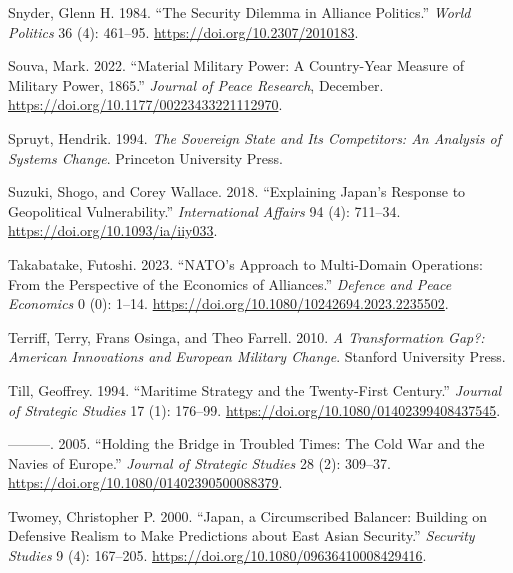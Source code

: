 \documentclass[
  12,
  letterpaper,
  DIV=11,
  numbers=noendperiod]{scrartcl}
\newlength{\cslhangindent}
\newlength{\cslentryspacingunit} %
\newenvironment{CSLReferences}[2] %
 {%
  \setlength{\parindent}{0pt}
  \ifodd #1
  \let\oldpar\par
  \def\par{\hangindent=\cslhangindent\oldpar}
  \fi
  \setlength{\parskip}{#2\cslentryspacingunit}
 }%
 {}
\begin{document}
\begin{CSLReferences}{1}{0}
\leavevmode{}%
Snyder, Glenn H. 1984. {``The {Security Dilemma} in {Alliance
Politics}.''} \emph{World Politics} 36 (4): 461--95.
\url{https://doi.org/10.2307/2010183}.

\leavevmode{}%
Souva, Mark. 2022. {``Material Military Power: {A} Country-Year Measure
of Military Power, 1865.''} \emph{Journal of Peace
Research}, December. \url{https://doi.org/10.1177/00223433221112970}.

\leavevmode{}%
Spruyt, Hendrik. 1994. \emph{The {Sovereign State} and {Its
Competitors}: {An Analysis} of {Systems Change}}. {Princeton University
Press}.

\leavevmode{}%
Suzuki, Shogo, and Corey Wallace. 2018. {``Explaining {Japan}'s Response
to Geopolitical Vulnerability.''} \emph{International Affairs} 94 (4):
711--34. \url{https://doi.org/10.1093/ia/iiy033}.

\leavevmode{}%
Takabatake, Futoshi. 2023. {``{NATO}'s {Approach} to {Multi-Domain
Operations}: {From} the {Perspective} of the {Economics} of
{Alliances}.''} \emph{Defence and Peace Economics} 0 (0): 1--14.
\url{https://doi.org/10.1080/10242694.2023.2235502}.

\leavevmode{}%
Terriff, Terry, Frans Osinga, and Theo Farrell. 2010. \emph{A
{Transformation Gap}?: {American Innovations} and {European Military
Change}}. {Stanford University Press}.

\leavevmode{}%
Till, Geoffrey. 1994. {``Maritime Strategy and the Twenty-First
Century.''} \emph{Journal of Strategic Studies} 17 (1): 176--99.
\url{https://doi.org/10.1080/01402399408437545}.

\leavevmode{}%
---------. 2005. {``Holding the {Bridge} in {Troubled Times}: {The Cold
War} and the {Navies} of {Europe}.''} \emph{Journal of Strategic
Studies} 28 (2): 309--37.
\url{https://doi.org/10.1080/01402390500088379}.

\leavevmode{}%
Twomey, Christopher P. 2000. {``Japan, a Circumscribed Balancer:
{Building} on Defensive Realism to Make Predictions about East {Asian}
Security.''} \emph{Security Studies} 9 (4): 167--205.
\url{https://doi.org/10.1080/09636410008429416}.


\end{CSLReferences}
\end{document}
